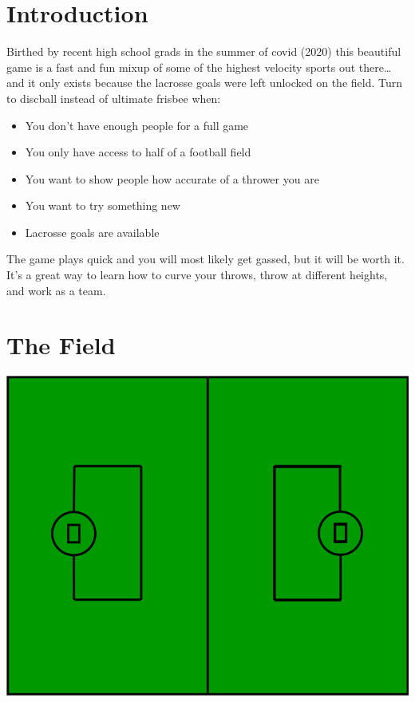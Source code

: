 \documentclass[10pt]{article}
\begin{document}
    \renewcommand*\contentsname{Table of Contents}
    \tableofcontents

    \newpage

    \section{Introduction}

    Birthed by recent high school grads in the summer of covid (2020) this beautiful game is a fast and fun mixup of some of the highest velocity sports out there\ldots and it only exists because the lacrosse goals were left unlocked on the field. Turn to discball instead of ultimate frisbee when: 
    \begin{itemize}
        \item You don't have enough people for a full game
        \item You only have access to half of a football field
        \item You want to show people how accurate of a thrower you are
        \item You want to try something new
        \item Lacrosse goals are available
    \end{itemize}
    The game plays quick and you will most likely get gassed, but it will be worth it. It's a great way to learn how to curve your throws, throw at different heights, and work as a team.

    \section{The Field}

    \includegraphics[width=.7\textwidth]{field/field}

    \vspace{5pt}
\end{document}
